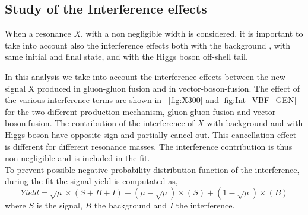 \subsection*{Study of the Interference effects}
\label{sec:interference}
When a resonance $X$, with a non negligible width is considered, it is important to take into account also the interference effects both with the \WW background , with same initial and final state, and with the Higgs boson off-shell tail. 

In this analysis  we take into account the interference effects between the
new signal X produced in gluon-gluon fusion and in vector-boson-fusion.
The effect of the various interference terms are shown in ~\ref{fig:X300} and  \ref{fig:Int_VBF_GEN} for the two different production mechanism, gluon-gluon fusion and vector-boson.fusion.  The contribution of the interference of $X$ with \WW background  and with Higgs boson have opposite sign and partially cancel out. This cancellation effect is different for different resonance masses.
The interference contribution is thus non negligible and is included in the fit. \\
To prevent possible negative probability distribution function of the interference,  during the fit the signal yield is computated as,
\begin{equation}
Yield=\sqrt{\mu} \times (S+B+I)+ (\mu -\sqrt{\mu}) \times (S) + (1-\sqrt{\mu}) \times (B)
\end{equation}
where  $S$ is the signal, $B$ the background and $I$ the interference.


